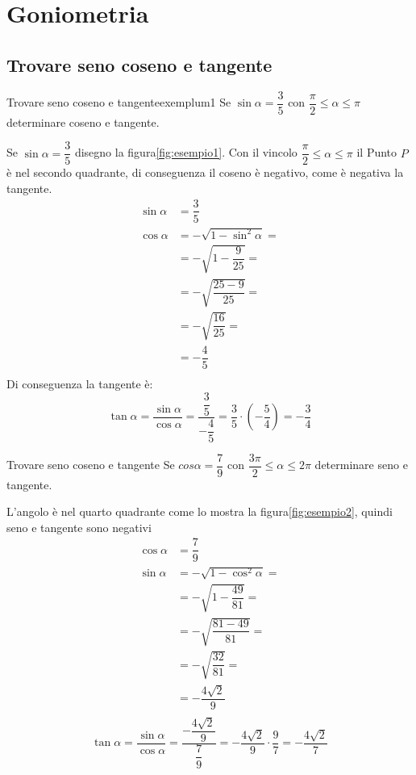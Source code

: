 \chapter{Goniometria}
\label{cha:goniometriaEss}
\section{Trovare seno coseno e tangente}
\begin{esempiot}{Trovare seno coseno e tangente}{exemplum1}
	Se $\sin\alpha=\dfrac{3}{5}$ con $\dfrac{\pi}{2}\leq\alpha\leq\pi$ determinare coseno e tangente.
\end{esempiot}
Se $\sin\alpha=\dfrac{3}{5}$ disegno la figura\nobs\vref{fig:esempio1}. Con il vincolo $\dfrac{\pi}{2}\leq\alpha\leq\pi$ il Punto $P$ è nel secondo quadrante, di conseguenza il coseno è negativo, come è negativa la tangente.
\begin{align*}
\sin\alpha&=\dfrac{3}{5}\\
\cos\alpha&=-\sqrt{1-\sin^2\alpha}=\\
&=-\sqrt{1-\dfrac{9}{25}}=\\
&=-\sqrt{\dfrac{25-9}{25}}=\\
&=-\sqrt{\dfrac{16}{25}}=\\
&=-\dfrac{4}{5}\\
\end{align*}
Di conseguenza la tangente è:
\[\tan\alpha=\dfrac{\sin\alpha}{\cos\alpha}=\dfrac{\dfrac{3}{5}}{-\dfrac{4}{5}}=\dfrac{3}{5}\cdot\left(-\dfrac{5}{4}\right)=-\dfrac{3}{4}\]
\begin{esempiot}{Trovare seno coseno e tangente}{}
	Se $cos\alpha=\dfrac{7}{9}$ con $\dfrac{3\pi}{2}\leq\alpha\leq 2\pi$ determinare seno e tangente.
\end{esempiot}
L'angolo è nel quarto quadrante come lo mostra la figura\nobs\vref{fig:esempio2}, quindi seno e tangente sono negativi
\begin{align*}
\cos\alpha&=\dfrac{7}{9}\\
\sin\alpha&=-\sqrt{1-\cos^2\alpha}=\\
&=-\sqrt{1-\dfrac{49}{81}}=\\
&=-\sqrt{\dfrac{81-49}{81}}=\\
&=-\sqrt{\dfrac{32}{81}}=\\
&=-\dfrac{4\sqrt{2}}{9}\\
\end{align*}
\[\tan\alpha=\dfrac{\sin\alpha}{\cos\alpha}=\dfrac{-\dfrac{4\sqrt{2}}{9}}{\dfrac{7}{9}}=-\dfrac{4\sqrt{2}}{9}\cdot\dfrac{9}{7}=-\dfrac{4\sqrt{2}}{7}\]
